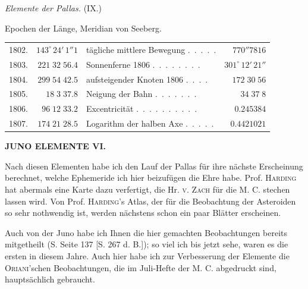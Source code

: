 \begin{center}
\emph{Elemente der Pallas.} (IX.)
\end{center}
\noindent Epochen der Länge, Meridian von Seeberg.\par\nobreak
\begin{center}\begingroup
\fontsize{8.6}{10.6}\selectfont
\setlength{\tabcolsep}{2.5pt}\renewcommand{\arraystretch}{1.12}
\begin{tabular}{@{}rr|lr@{}}
1802. & $143^\circ\,24'\,1''1$ & tägliche mittlere Bewegung .\ .\ .\ .\ . & $770''7816$ \\
1803. & $221\;32\;56.4$ & Sonnenferne 1806 .\ .\ .\ .\ .\ .\ .\ . & $301^\circ\,12'\,21''$ \\
1804. & $299\;54\;42.5$ & aufsteigender Knoten 1806 .\ .\ .\ . & $172\;30\;56$ \\
1805. & $18\;3\;37.8$ & Neigung der Bahn .\ .\ .\ .\ .\ .\ . & $34\;37\;8$ \\
1806. & $96\;12\;33.2$ & Excentricität .\ .\ .\ .\ .\ .\ .\ .\ .\ . & $0.245384$ \\
1807. & $174\;21\;28.5$ & Logarithm der halben Axe .\ .\ .\ .\ . & $0.4421021$ \\
\end{tabular}\endgroup\end{center}
\clearpage
\thispagestyle{empty}
\noindent{}%
\makebox[12mm][l]{}%
\parbox[t]{\dimexpr\linewidth-24mm\relax}{\centering\footnotesize\bfseries JUNO ELEMENTE VI.\par}%
\par\nobreak\medskip
\par\indent Nach diesen Elementen habe ich den Lauf der Pallas für ihre nächste Erscheinung berechnet,
welche Ephemeride ich hier beizufügen die Ehre habe. Prof. \textsc{Harding} hat abermals eine Karte dazu
verfertigt, die Hr. \textsc{v. Zach} für die M. C. stechen lassen wird. Von Prof. \textsc{Harding}'s Atlas, der für die
Beobachtung der Asteroiden so sehr nothwendig ist, werden nächstens schon ein paar Blätter erscheinen.

\par\indent Auch von der Juno habe ich Ihnen die hier gemachten Beobachtungen bereits mitgetheilt (S.
Seite 137 [S. 267 d. B.]); so viel ich bis jetzt sehe, waren es die ersten in diesem Jahre. Auch hier habe
ich zur Verbesserung der Elemente die \textsc{Oriani}'schen Beobachtungen, die im Juli-Hefte der M. C. abgedruckt sind, hauptsächlich gebraucht.

